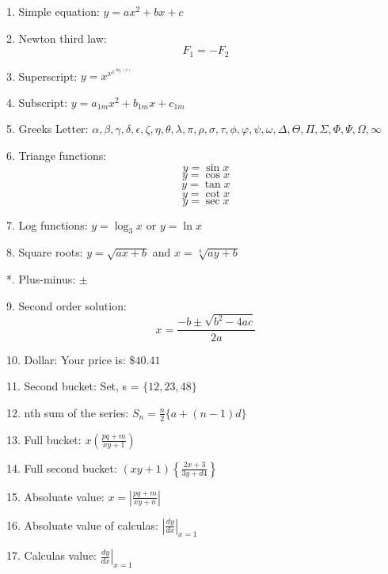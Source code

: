 \documentclass[11pt]{article}
\begin{document}
1. Simple equation: $y = ax^2 + bx + c$

2. Newton third law: $$F_1 = -F_2$$

3. Superscript: $y = x^{x^{x^{\log(x)}}}$

4. Subscript: $y = a_{1m}x^2+b_{1m}x+c_{1m}$

5. Greeks Letter: $\alpha, \beta, \gamma, \delta, \epsilon, \zeta, \eta, \theta, \lambda, \pi, \rho, \sigma, \tau, \phi, \varphi, \psi, \omega, \Delta, \Theta, \Pi, \Sigma, \Phi, \Psi, \Omega, \infty$

6. Triange functions: $$y = \sin{x}$$
					  $$y = \cos{x}$$
					  $$y = \tan{x}$$
					  $$y = \cot{x}$$
					  $$y = \sec{x}$$
					  
7. Log functions: $y = \log_3{x}$ or $y = \ln{x}$

8. Square roots: $y = \sqrt{ax + b}$ and $x = \sqrt[4]{ay + b}$

*. Plus-minus: $\pm$

9. Second order solution: $$x = \frac{-b \pm \sqrt{b^2 - 4ac}}{2a}$$

10. Dollar: Your price is: $\$40.41$

11. Second bucket: Set, s = $\{12, 23, 48\}$

12. nth sum of the series: $S_n = \displaystyle{\frac{n}{2}}\{a + (n - 1)d\}$

13. Full bucket: $x\left(\frac{pq+m}{xy+1}\right)$

14. Full second bucket: $\left(xy+1\right)\left\{\frac{2x+3}{3y+d4}\right\}$

15. Absoluate value: $x = \left|\displaystyle{\frac{pq+m}{xy+n}}\right|$

16. Absoluate value of calculas: $\left|\displaystyle{\frac{dy}{dx}}\right|_{x=1}$

17. Calculas value: $\displaystyle{\left.\frac{dy}{dx}\right|_{x=1}}$
\end{document}
